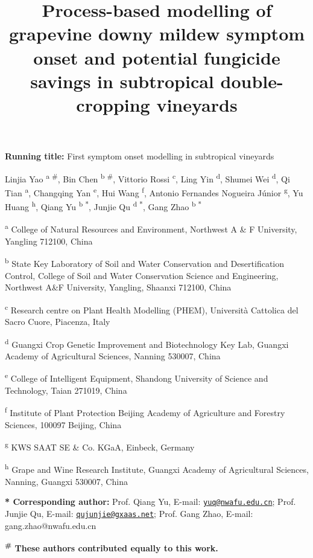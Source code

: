 \documentclass{article}
\title{Process-based modelling of grapevine downy mildew symptom onset and
potential fungicide savings in subtropical double-cropping vineyards}
\author{}
\date{}
\begin{document}
\doublespacing
{}
\linenumbers
\maketitle

\textbf{Running title:} First symptom onset modelling in subtropical vineyards

Linjia Yao \textsuperscript{a \#}, Bin Chen \textsuperscript{b \#},
Vittorio Rossi \textsuperscript{c}, Ling Yin \textsuperscript{d}, Shumei
Wei \textsuperscript{d}, Qi Tian \textsuperscript{a}, Changqing Yan
\textsuperscript{e}, Hui Wang \textsuperscript{f}, Antonio Fernandes
Nogueira Júnior \textsuperscript{g}, Yu Huang \textsuperscript{h}, Qiang
Yu \textsuperscript{b *}, Junjie Qu \textsuperscript{d *}, Gang Zhao
\textsuperscript{b *}

\textsuperscript{a} College of Natural Resources and Environment,
Northwest A \& F University, Yangling 712100, China

\textsuperscript{b} State Key Laboratory of Soil and Water Conservation
and Desertification Control, College of Soil and Water Conservation
Science and Engineering, Northwest A\&F University, Yangling, Shaanxi
712100, China

\textsuperscript{c} Research centre on Plant Health Modelling (PHEM),
Università Cattolica del Sacro Cuore, Piacenza, Italy

\textsuperscript{d} Guangxi Crop Genetic Improvement and Biotechnology
Key Lab, Guangxi Academy of Agricultural Sciences, Nanning 530007, China

\textsuperscript{e} College of Intelligent Equipment, Shandong
University of Science and Technology, Taian 271019, China

\textsuperscript{f} Institute of Plant Protection Beijing Academy of
Agriculture and Forestry Sciences, 100097 Beijing, China

\textsuperscript{g} KWS SAAT SE \& Co. KGaA, Einbeck, Germany

\textsuperscript{h} Grape and Wine Research Institute, Guangxi Academy
of Agricultural Sciences, Nanning, Guangxi 530007, China

\textbf{* Corresponding author:} Prof. Qiang Yu, E-mail:
\href{mailto:yuq@nwafu.edu.cn}{\nolinkurl{yuq@nwafu.edu.cn}}; Prof.
Junjie Qu, E-mail:
\href{mailto:qujunjie@gxaas.net}{\nolinkurl{qujunjie@gxaas.net}}; Prof.
Gang Zhao, E-mail: gang.zhao@nwafu.edu.cn

\textbf{\textsuperscript{\#} These authors contributed equally to this
work.}
\end{document}
